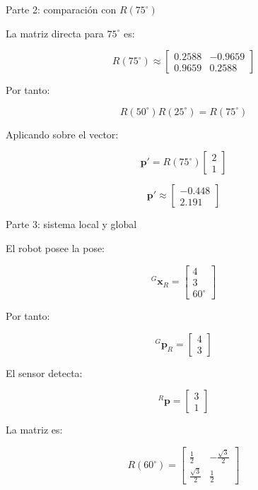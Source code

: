 \documentclass[aspectratio=169]{beamer}
\begin{document}
\begin{frame}{Parte 2: comparación con \texorpdfstring{$R(75^\circ)$}{R 75}}

    La matriz directa para $75^\circ$ es:

    \[
    R(75^\circ)
    \approx
    \begin{bmatrix}
        0.2588 & -0.9659\\
        0.9659 & 0.2588
    \end{bmatrix}
    \]

    Por tanto:

    \[
    \boxed{
        R(50^\circ)R(25^\circ)=R(75^\circ)
    }
    \]

    Aplicando sobre el vector:

    \[
    \mathbf{p}'
    =
    R(75^\circ)
    \begin{bmatrix}
        2\\
        1
    \end{bmatrix}
    \]

    \[
    \boxed{
        \mathbf{p}'
        \approx
        \begin{bmatrix}
            -0.448\\
            2.191
    \end{bmatrix}}
    \]

\end{frame}

\begin{frame}{Parte 3: sistema local y global}

    El robot posee la pose:

    \[
    {}^{G}\mathbf{x}_R
    =
    \begin{bmatrix}
        4\\
        3\\
        60^\circ
    \end{bmatrix}
    \]

    Por tanto:

    \[
    {}^{G}\mathbf{p}_R
    =
    \begin{bmatrix}
        4\\
        3
    \end{bmatrix}
    \]

    El sensor detecta:

    \[
    {}^{R}\mathbf{p}
    =
    \begin{bmatrix}
        3\\
        1
    \end{bmatrix}
    \]

    La matriz es:

    \[
    R(60^\circ)
    =
    \begin{bmatrix}
        \frac{1}{2} & -\frac{\sqrt{3}}{2}\\
        \frac{\sqrt{3}}{2} & \frac{1}{2}
    \end{bmatrix}
    \]

\end{frame}
\end{document}
